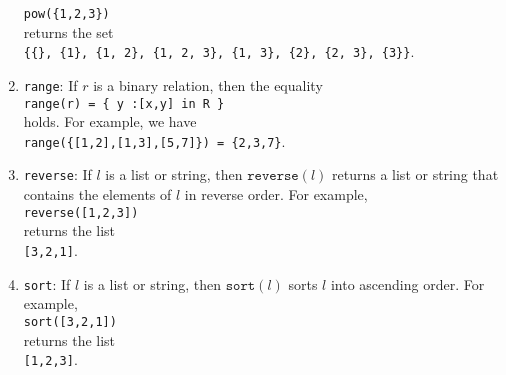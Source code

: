 \begin{enumerate}
      \hspace*{1.3cm}
      \texttt{pow(\{1,2,3\})}
      \\[0.2cm]
      returns the set
      \\[0.2cm]
      \hspace*{1.3cm}
      \texttt{\{\{\}, \{1\}, \{1, 2\}, \{1, 2, 3\}, \{1, 3\}, \{2\}, \{2, 3\}, \{3\}\}}.
\item \texttt{range}: If $r$ is a binary relation, then the equality
      \\[0.2cm]
      \hspace*{1.3cm}
      \texttt{range(r) = \{ y :[x,y] in R \}}
      \\[0.2cm]
      holds.  For example, we have
      \\[0.2cm]
      \hspace*{1.3cm}
      \texttt{range(\{[1,2],[1,3],[5,7]\}) = \{2,3,7\}}.
\item \texttt{reverse}: If $l$ is a list or string, then $\mathtt{reverse}(l)$ returns a 
      list or string that contains the elements of $l$ in reverse order.  For example,
      \\[0.2cm]
      \hspace*{1.3cm}
      \texttt{reverse([1,2,3])}
      \\[0.2cm]
      returns the list
      \\[0.2cm]
      \hspace*{1.3cm}
      \texttt{[3,2,1]}.
\item \texttt{sort}: If $l$ is a list or string, then $\mathtt{sort}(l)$ sorts $l$ into
      ascending order.  For example,
      \\[0.2cm]
      \hspace*{1.3cm}
      \texttt{sort([3,2,1])}
      \\[0.2cm]
      returns the list
      \\[0.2cm]
      \hspace*{1.3cm}
      \texttt{[1,2,3]}.
\end{enumerate}

